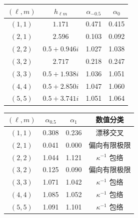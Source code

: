 \documentclass[UTF8,fontset=fandol,12pt,a4paper,oneside,openany]{ctexrep}
\begin{document}
\noindent\begin{minipage}{\linewidth}
\captionsetup{type=table}\caption{历史近极端三次阈值响应，待端点修正重算。}\label{audit:tab:near-extremal-threshold}
\centering\fontsize{10.5}{14}\selectfont
\setlength{\tabcolsep}{6pt}\renewcommand{\arraystretch}{1.2}
\par{}\par\smallskip
\begin{tabular}{cccc}\toprule
$(\ell,m)$ & $h_{\ell m}$ & $\alpha_{-0.5}$ & $\alpha_{0}$\\\midrule
$(1,1)$ & $1.171$ & 0.471 & 0.415\\
$(2,1)$ & $2.596$ & 0.103 & 0.092\\
$(2,2)$ & $0.5+0.946i$ & 1.027 & 1.038\\
$(3,2)$ & $2.717$ & 0.218 & 0.247\\
$(3,3)$ & $0.5+1.938i$ & 1.036 & 1.051\\
$(4,4)$ & $0.5+2.850i$ & 1.047 & 1.060\\
$(5,5)$ & $0.5+3.741i$ & 1.051 & 1.064\\
\bottomrule\end{tabular}
\par\medskip
\par{}\par\smallskip
\begin{tabular}{cccc}\toprule
$(\ell,m)$ & $\alpha_{0.5}$ & $\alpha_{1}$ & 数值分类\\\midrule
$(1,1)$ & 0.308 & 0.236 & 漂移交叉\\
$(2,1)$ & 0.041 & 0.000 & 偏向有限极限\\
$(2,2)$ & 1.044 & 1.121 & $\kappa^{-1}$ 包络\\
$(3,2)$ & 0.125 & 0.090 & 偏向有限极限\\
$(3,3)$ & 1.071 & 1.042 & $\kappa^{-1}$ 包络\\
$(4,4)$ & 1.085 & 1.052 & $\kappa^{-1}$ 包络\\
$(5,5)$ & 1.091 & 1.101 & $\kappa^{-1}$ 包络\\
\bottomrule\end{tabular}
\end{minipage}\par\addvspace{10pt}
\par\addvspace{14pt}
\end{document}
